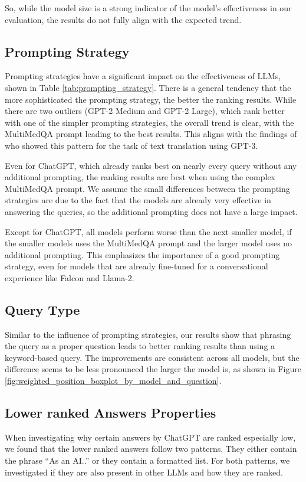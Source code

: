 So, while the model size is a strong indicator of the model's effectiveness in our evaluation, the results do not fully align with the expected trend.

\subsection{Prompting Strategy}
Prompting strategies have a significant impact on the effectiveness of LLMs, shown in Table \ref{tab:prompting_strategy}.
There is a general tendency that the more sophisticated the prompting strategy, the better the ranking results.
While there are two outliers (GPT-2 Medium and GPT-2 Large), which rank better with one of the simpler prompting strategies, the overall trend is clear, with the MultiMedQA prompt leading to the best results.
This aligns with the findings of \cite{reynolds:2021:Prompt} who showed this pattern for the task of text translation using GPT-3.

Even for ChatGPT, which already ranks best on nearly every query without any additional prompting, the ranking results are best when using the complex MultiMedQA prompt.
We assume the small differences between the prompting strategies are due to the fact that the models are already very effective in answering the queries, so the additional prompting does not have a large impact.

Except for ChatGPT, all models perform worse than the next smaller model, if the smaller models uses the MultiMedQA prompt and the larger model uses no additional prompting.
This emphasizes the importance of a good prompting strategy, even for models that are already fine-tuned for a conversational experience like Falcon and Llama-2.

\subsection{Query Type}
Similar to the influence of prompting strategies, our results show that phrasing the query as a proper question leads to better ranking results than using a keyword-based query.
The improvements are consistent across all models, but the difference seems to be less pronounced the larger the model is, as shown in Figure \ref{fig:weighted_position_boxplot_by_model_and_question}.


\subsection{Lower ranked Answers Properties}
When investigating why certain answers by ChatGPT are ranked especially low, we found that the lower ranked answers follow two patterns.
They either contain the phrase ``As an AI..'' or they contain a formatted list.
For both patterns, we investigated if they are also present in other LLMs and how they are ranked.

